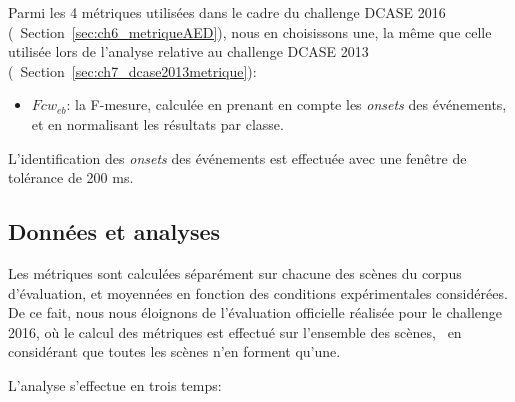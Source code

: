 Parmi les 4 métriques utilisées dans le cadre du challenge DCASE 2016 (\cf~Section~\ref{sec:ch6_metriqueAED}), nous en choisissons une, la même que celle utilisée lors de l'analyse relative au challenge DCASE 2013 (\cf~Section~\ref{sec:ch7_dcase2013metrique}):

\begin{itemize}
\item $Fcw_{eb}$: la F-mesure, calculée en prenant en compte les \emph{onsets} des événements, et en normalisant les résultats par classe.
\end{itemize}

L'identification des \emph{onsets} des événements est effectuée avec une fenêtre de tolérance de 200 ms.

\subsection{Données et analyses}

Les métriques sont calculées séparément sur chacune des scènes du corpus d'évaluation, et moyennées en fonction des conditions expérimentales considérées. De ce fait, nous nous éloignons de l'évaluation officielle réalisée pour le challenge 2016, où le calcul des métriques est effectué sur l'ensemble des scènes, \ie~en considérant que toutes les scènes n'en forment qu'une.

L'analyse s'effectue en trois temps:

